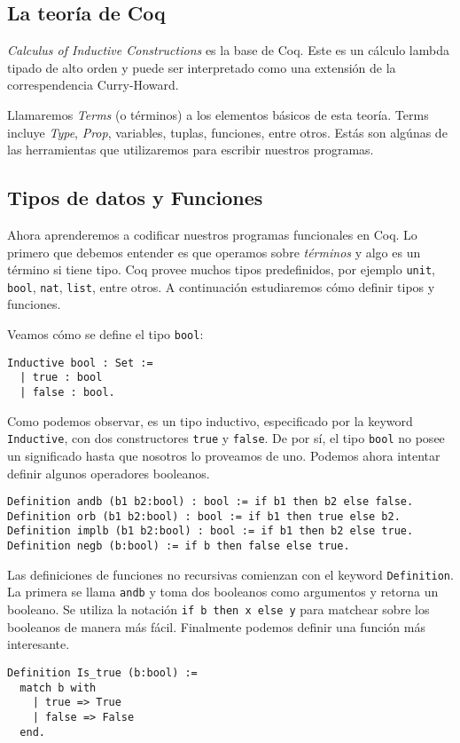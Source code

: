 \subsection{La teoría de Coq}

\textit{Calculus of Inductive Constructions} es la base de Coq. Este es un cálculo lambda tipado de alto orden y puede ser interpretado como una extensión de la correspendencia Curry-Howard.

Llamaremos \textit{Terms} (o términos) a los elementos básicos de esta teoría. Terms incluye \textit{Type}, \textit{Prop}, variables, tuplas, funciones, entre otros. Estás son algúnas de las herramientas que utilizaremos para escribir nuestros programas.


\subsection{Tipos de datos y Funciones}

Ahora aprenderemos a codificar nuestros programas funcionales en Coq. Lo primero que debemos entender es que operamos sobre \textit{términos} y algo es un término si tiene tipo. Coq provee muchos tipos predefinidos, por ejemplo \lstinline{unit}, \lstinline{bool}, \lstinline{nat}, \lstinline{list}, entre otros. A continuación estudiaremos cómo definir tipos y funciones.

Veamos cómo se define el tipo \lstinline{bool}:
\begin{lstlisting}
Inductive bool : Set :=
  | true : bool
  | false : bool.
\end{lstlisting}
Como podemos observar, es un tipo inductivo, especificado por la keyword \lstinline{Inductive}, con dos constructores \lstinline{true} y \lstinline{false}. De por sí, el tipo \lstinline{bool} no posee un significado hasta que nosotros lo proveamos de uno. Podemos ahora intentar definir algunos operadores booleanos.
\begin{lstlisting}
Definition andb (b1 b2:bool) : bool := if b1 then b2 else false.
Definition orb (b1 b2:bool) : bool := if b1 then true else b2.
Definition implb (b1 b2:bool) : bool := if b1 then b2 else true.
Definition negb (b:bool) := if b then false else true.
\end{lstlisting}
Las definiciones de funciones no recursivas comienzan con el keyword \lstinline{Definition}. La primera se llama \lstinline{andb} y toma dos booleanos como argumentos y retorna un booleano. Se utiliza la notación \lstinline{if b then x else y} para matchear sobre los booleanos de manera más fácil. Finalmente podemos definir una función más interesante.
\begin{lstlisting}
Definition Is_true (b:bool) :=
  match b with
    | true => True
    | false => False
  end.
\end{lstlisting}

